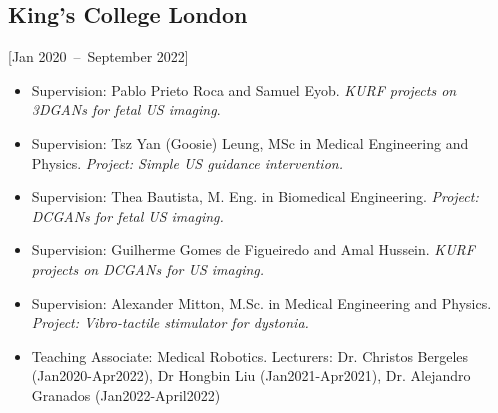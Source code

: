 \documentclass{mycv}
\begin{document}
\subsection{King's College London}[Jan 2020~--~September 2022]
\begin{itemize}
	\item 	Supervision: Pablo Prieto Roca and Samuel Eyob.
		\textit{KURF projects on 3DGANs for fetal US imaging}.
	\item 	Supervision: Tsz Yan (Goosie) Leung, MSc in Medical Engineering and Physics.
		\textit{Project: Simple US guidance intervention.}
	\item 	Supervision: Thea Bautista, M. Eng. in Biomedical Engineering.
		\textit{Project: DCGANs for fetal US imaging.}
	\item 	Supervision: Guilherme Gomes de Figueiredo and Amal Hussein.
		\textit{KURF projects on DCGANs for US imaging.}
	\item 	Supervision: Alexander Mitton, M.Sc. in Medical Engineering and Physics.
		\textit{Project: Vibro-tactile stimulator for dystonia.}
	\item Teaching Associate: Medical Robotics. Lecturers: Dr. Christos Bergeles (Jan2020-Apr2022), Dr Hongbin Liu (Jan2021-Apr2021), Dr. Alejandro Granados (Jan2022-April2022) 
\end{itemize}


\end{document}
